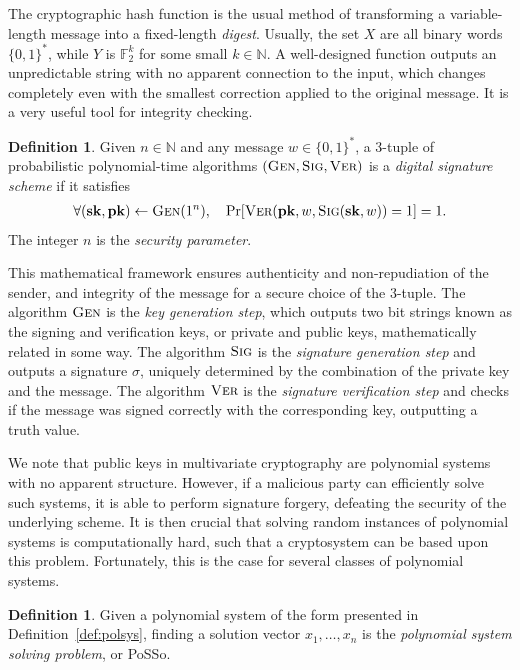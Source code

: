 \documentclass[draft, 12pt, a4paper, oneside]{memoir}
\theoremstyle{definition}
\newtheorem{definition}[theorem]{Definition}
\begin{document}
The cryptographic hash function is the usual method of transforming a variable-length message into a fixed-length \emph{digest}. Usually, the set $X$ are all binary words $\{0, 1\}^{*}$, while $Y$ is $\mathbb{F}_{2}^{k}$ for some small $k \in \mathbb{N}$. A well-designed function outputs an unpredictable string with no apparent connection to the input, which changes completely even with the smallest correction applied to the original message. It is a very useful tool for integrity checking.

\begin{definition}
  Given $n \in \mathbb{N}$ and any message $w \in \{0, 1\}^{*}$, a $3$-tuple of probabilistic polynomial-time algorithms $(\textsc{Gen}, \textsc{Sig}, \textsc{Ver})$ is a \emph{digital signature scheme} if it satisfies
  \begin{align}
     \forall (\mathbf{sk}, \mathbf{pk}) \leftarrow \textsc{Gen}(1^{n}),
       \quad \Pr[\textsc{Ver}(\mathbf{pk}, w, \textsc{Sig}(\mathbf{sk}, w)) = 1] = 1.
  \end{align}
  The integer $n$ is the \emph{security parameter}.
\end{definition}

This mathematical framework ensures authenticity and non-repudiation of the sender, and integrity of the message for a secure choice of the $3$-tuple. The algorithm $\textsc{Gen}$ is the \emph{key generation step}, which outputs two bit strings known as the signing and verification keys, or private and public keys, mathematically related in some way. The algorithm $\textsc{Sig}$ is the \emph{signature generation step} and outputs a signature $\sigma$, uniquely determined by the combination of the private key and the message. The algorithm $\textsc{Ver}$ is the \emph{signature verification step} and checks if the message was signed correctly with the corresponding key, outputting a truth value.

We note that public keys in multivariate cryptography are polynomial systems with no apparent structure. However, if a malicious party can efficiently solve such systems, it is able to perform signature forgery, defeating the security of the underlying scheme. It is then crucial that solving random instances of polynomial systems is computationally hard, such that a cryptosystem can be based upon this problem. Fortunately, this is the case for several classes of polynomial systems.

\begin{definition}\label{def:posso}
  Given a polynomial system of the form presented in Definition~\ref{def:polsys}, finding a solution vector $x_{1}, \dots, x_{n}$ is the \emph{polynomial system solving problem}, or \textsf{PoSSo}.
\end{definition}
\end{document}
